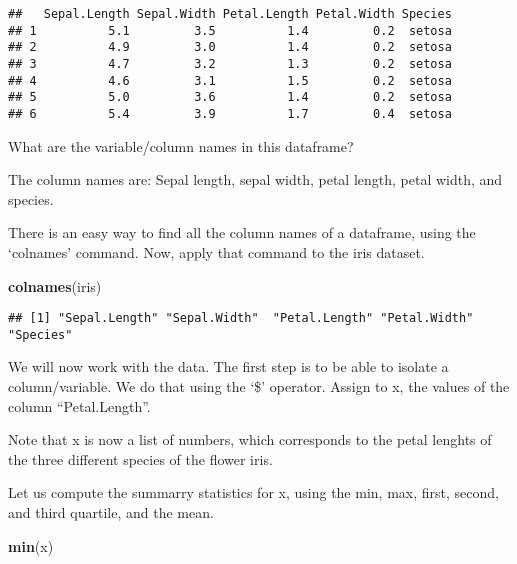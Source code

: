 \documentclass[
]{article}
\newenvironment{Shaded}{\begin{snugshade}}{\end{snugshade}}
\newcommand{\FunctionTok}[1]{\textcolor[rgb]{0.13,0.29,0.53}{\textbf{#1}}}
\newcommand{\NormalTok}[1]{#1}
\newcommand{\OtherTok}[1]{\textcolor[rgb]{0.56,0.35,0.01}{#1}}
\newcommand{\SpecialCharTok}[1]{\textcolor[rgb]{0.81,0.36,0.00}{\textbf{#1}}}
\begin{document}
\begin{verbatim}
##   Sepal.Length Sepal.Width Petal.Length Petal.Width Species
## 1          5.1         3.5          1.4         0.2  setosa
## 2          4.9         3.0          1.4         0.2  setosa
## 3          4.7         3.2          1.3         0.2  setosa
## 4          4.6         3.1          1.5         0.2  setosa
## 5          5.0         3.6          1.4         0.2  setosa
## 6          5.4         3.9          1.7         0.4  setosa
\end{verbatim}

What are the variable/column names in this dataframe?

The column names are: Sepal length, sepal width, petal length, petal
width, and species.

There is an easy way to find all the column names of a dataframe, using
the `colnames' command. Now, apply that command to the iris dataset.

\begin{Shaded}
\begin{Highlighting}[]
\FunctionTok{colnames}\NormalTok{(iris)}
\end{Highlighting}
\end{Shaded}

\begin{verbatim}
## [1] "Sepal.Length" "Sepal.Width"  "Petal.Length" "Petal.Width"  "Species"
\end{verbatim}

We will now work with the data. The first step is to be able to isolate
a column/variable. We do that using the `\$' operator. Assign to x, the
values of the column ``Petal.Length''.

\begin{Shaded}
\end{Shaded}

Note that x is now a list of numbers, which corresponds to the petal
lenghts of the three different species of the flower iris.

Let us compute the summarry statistics for x, using the min, max, first,
second, and third quartile, and the mean.

\begin{Shaded}
\begin{Highlighting}[]
\FunctionTok{min}\NormalTok{(x)}
\end{Highlighting}
\end{Shaded}
\end{document}
